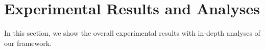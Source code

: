 
% 

\section{Experimental Results and Analyses}
In this section, we show the overall experimental results with in-depth analyses of our framework. 


